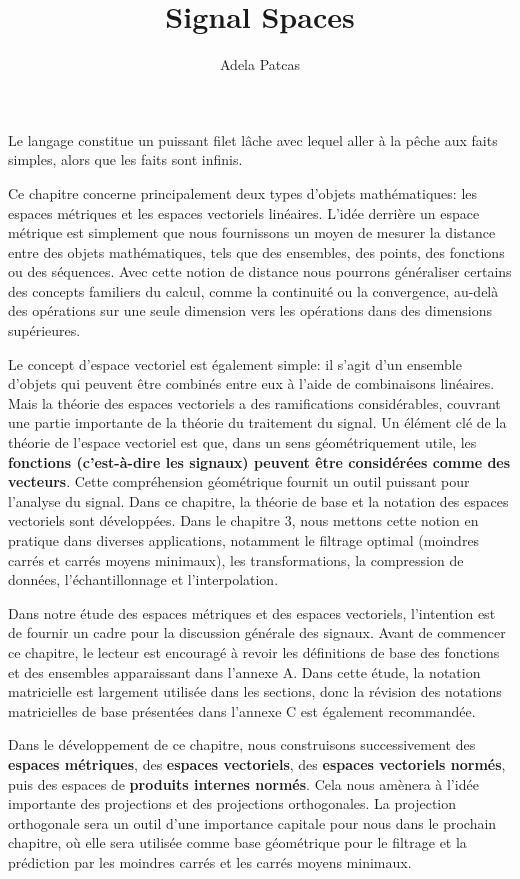 \documentclass[11pt,twoside,a4paper]{article}
\author{Adela Patcas}
\title{Signal Spaces}
\begin{document}
Le langage constitue un puissant filet lâche avec lequel aller à la pêche aux faits simples, alors que les faits sont infinis.

Ce chapitre concerne principalement deux types d'objets mathématiques: les espaces métriques et les espaces vectoriels linéaires. L'idée derrière un espace métrique est 
simplement que nous fournissons un moyen de mesurer la distance entre des objets mathématiques, tels que des ensembles, des points, des fonctions ou des séquences. 
Avec cette notion de distance nous pourrons généraliser certains des concepts familiers du calcul, comme la continuité ou la convergence, au-delà des opérations sur une 
seule dimension vers les opérations dans des dimensions supérieures.

Le concept d'espace vectoriel est également simple: il s'agit d'un ensemble d'objets qui peuvent être combinés entre eux à l'aide de combinaisons linéaires. 
Mais la théorie des espaces vectoriels a des ramifications considérables, couvrant une partie importante de la théorie du traitement du signal. Un élément clé de la 
théorie de l'espace vectoriel est que, dans un sens géométriquement utile, les \textbf{fonctions (c'est-à-dire les signaux) peuvent être considérées comme des vecteurs}. 
Cette compréhension géométrique fournit un outil puissant pour l'analyse du signal. Dans ce chapitre, la théorie de base et la notation des espaces vectoriels sont développées. 
Dans le chapitre 3, nous mettons cette notion en pratique dans diverses applications, notamment le filtrage optimal (moindres carrés et carrés moyens minimaux), les transformations, 
la compression de données, l'échantillonnage et l'interpolation.

Dans notre étude des espaces métriques et des espaces vectoriels, l'intention est de fournir un cadre pour la discussion générale des signaux. Avant de commencer ce chapitre, 
le lecteur est encouragé à revoir les définitions de base des fonctions et des ensembles apparaissant dans l'annexe A. Dans cette étude, la notation matricielle est largement 
utilisée dans les sections, donc la révision des notations matricielles de base présentées dans l'annexe C est également recommandée.

Dans le développement de ce chapitre, nous construisons successivement des \textbf{espaces métriques}, des \textbf{espaces vectoriels}, des \textbf{espaces vectoriels normés}, puis des espaces de \textbf{produits internes normés}. 
Cela nous amènera à l'idée importante des projections et des projections orthogonales. La projection orthogonale sera un outil d'une importance capitale pour nous dans le prochain chapitre, 
où elle sera utilisée comme base géométrique pour le filtrage et la prédiction par les moindres carrés et les carrés moyens minimaux.
\end{document}
